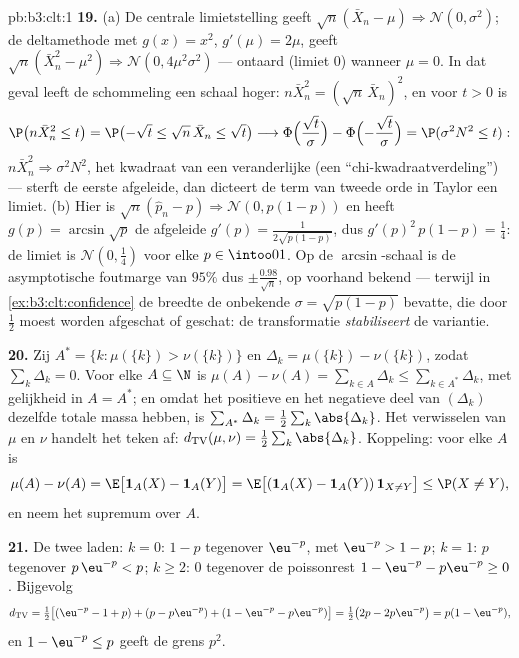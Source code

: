\begin{solution}{pb:b3:clt:1}
\textbf{19.} (a) De centrale limietstelling geeft $\sqrt
n(\bar X_n - \mu) \Rightarrow \mathcal N(0, \sigma^2)$; de
deltamethode met $g(x) = x^2$, $g'(\mu) = 2\mu$, geeft
$\sqrt n(\bar X_n^2 - \mu^2) \Rightarrow \mathcal N(0,
4\mu^2\sigma^2)$ --- ontaard (limiet $0$) wanneer $\mu = 0$.
In dat geval leeft de schommeling een schaal hoger: $n\bar
X_n^2 = (\sqrt n\,\bar X_n)^2$, en voor $t > 0$ is
\[
\P\bigl(n\bar X_n^2 \leq t\bigr) = \P\bigl(-\sqrt t \leq
\sqrt n\,\bar X_n \leq \sqrt t\bigr) \longrightarrow
\Phi\Bigl(\frac{\sqrt t}\sigma\Bigr) -
\Phi\Bigl(-\frac{\sqrt t}\sigma\Bigr) = \P(\sigma^2N^2
\leq t) :
\]
$n\bar X_n^2 \Rightarrow \sigma^2N^2$, het kwadraat van een
 veranderlijke (een ``chi-kwadraatverdeling'')
--- sterft de eerste afgeleide, dan dicteert de term van
tweede orde in Taylor een  limiet. (b) Hier
is $\sqrt n(\hat p_n - p) \Rightarrow \mathcal N(0, p(1 -
p))$ en heeft $g(p) = \arcsin\sqrt p$ de afgeleide $g'(p) =
\frac1{2\sqrt{p(1 - p)}}$, dus $g'(p)^2\,p(1 - p) =
\frac14$: de limiet is $\mathcal N(0, \frac14)$ voor elke $p
\in \intoo01$. Op de $\arcsin$-schaal is de asymptotische
foutmarge van $95\%$ dus $\pm \frac{0.98}{\sqrt n}$, op
voorhand bekend --- terwijl in
\cref{ex:b3:clt:confidence} de breedte de onbekende $\sigma
= \sqrt{p(1-p)}$ bevatte, die door $\frac12$ moest worden
afgeschat of geschat: de transformatie
\emph{stabiliseert} de variantie.

\textbf{20.} Zij $A^* = \{k : \mu(\{k\}) > \nu(\{k\})\}$ en
$\Delta_k = \mu(\{k\}) - \nu(\{k\})$, zodat
$\sum_k\Delta_k = 0$. Voor elke $A \subseteq \N$ is $\mu(A)
- \nu(A) = \sum_{k\in A}\Delta_k \leq \sum_{k\in
A^*}\Delta_k$, met gelijkheid in $A = A^*$; en omdat het
positieve en het negatieve deel van $(\Delta_k)$ dezelfde
totale massa hebben, is $\sum_{A^*}\Delta_k =
\frac12\sum_k\abs{\Delta_k}$. Het verwisselen van $\mu$ en
$\nu$ handelt het teken af: $d_{\mathrm{TV}}(\mu, \nu) =
\frac12\sum_k\abs{\Delta_k}$. Koppeling: voor elke $A$ is
\[
\mu(A) - \nu(A) = \E\bigl[\mathbf 1_A(X) - \mathbf
1_A(Y)\bigr] = \E\bigl[(\mathbf 1_A(X) - \mathbf
1_A(Y))\,\mathbf 1_{X\neq Y}\bigr] \leq \P(X \neq Y),
\]
en neem het supremum over $A$.

\textbf{21.} De twee  laden: $k = 0$: $1 - p$
tegenover $\eu^{-p}$, met $\eu^{-p} > 1 - p$; $k = 1$: $p$
tegenover $p\,\eu^{-p} < p$; $k \geq 2$: $0$ tegenover de
poissonrest $1 - \eu^{-p} - p\eu^{-p} \geq 0$. Bijgevolg
\[
d_{\mathrm{TV}} = \tfrac12\bigl[(\eu^{-p} - 1 + p) + (p -
p\eu^{-p}) + (1 - \eu^{-p} - p\eu^{-p})\bigr] =
\tfrac12\bigl(2p - 2p\eu^{-p}\bigr) = p(1 - \eu^{-p}),
\]
en $1 - \eu^{-p} \leq p$ geeft de grens $p^2$.


\end{solution}
